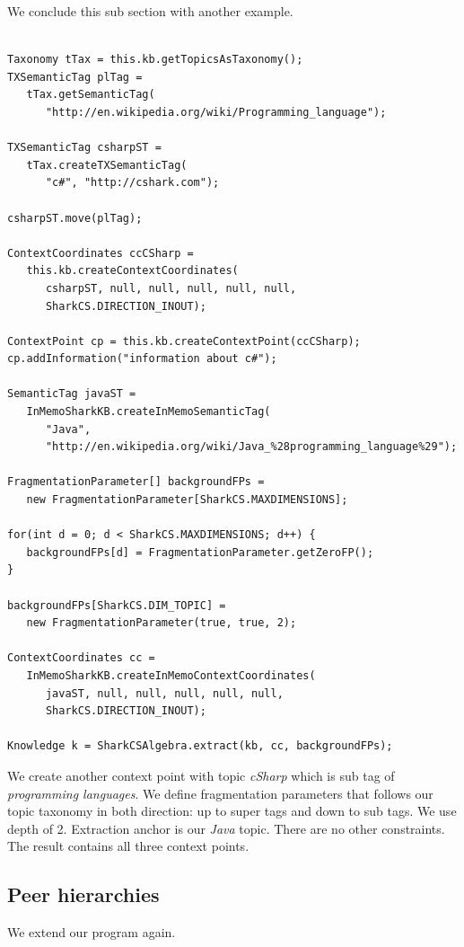 We conclude this sub section with another example.
\begin{verbatim}

Taxonomy tTax = this.kb.getTopicsAsTaxonomy();
TXSemanticTag plTag =
   tTax.getSemanticTag(
      "http://en.wikipedia.org/wiki/Programming_language");

TXSemanticTag csharpST =
   tTax.createTXSemanticTag(
      "c#", "http://cshark.com");

csharpST.move(plTag);

ContextCoordinates ccCSharp =
   this.kb.createContextCoordinates(
      csharpST, null, null, null, null, null,
      SharkCS.DIRECTION_INOUT);

ContextPoint cp = this.kb.createContextPoint(ccCSharp);
cp.addInformation("information about c#");

SemanticTag javaST =
   InMemoSharkKB.createInMemoSemanticTag(
      "Java",
      "http://en.wikipedia.org/wiki/Java_%28programming_language%29");

FragmentationParameter[] backgroundFPs =
   new FragmentationParameter[SharkCS.MAXDIMENSIONS];

for(int d = 0; d < SharkCS.MAXDIMENSIONS; d++) {
   backgroundFPs[d] = FragmentationParameter.getZeroFP();
}

backgroundFPs[SharkCS.DIM_TOPIC] =
   new FragmentationParameter(true, true, 2);

ContextCoordinates cc =
   InMemoSharkKB.createInMemoContextCoordinates(
      javaST, null, null, null, null, null,
      SharkCS.DIRECTION_INOUT);

Knowledge k = SharkCSAlgebra.extract(kb, cc, backgroundFPs);
\end{verbatim}

We create another context point with topic {\it cSharp} which is sub tag of {\it programming languages}. We define fragmentation parameters that follows our topic taxonomy in both direction: up to super tags and down to sub tags. We use depth of 2. Extraction anchor is our {\it Java} topic. There are no other constraints. The result contains all three context points.

\subsection{Peer hierarchies}
We extend our program again.

